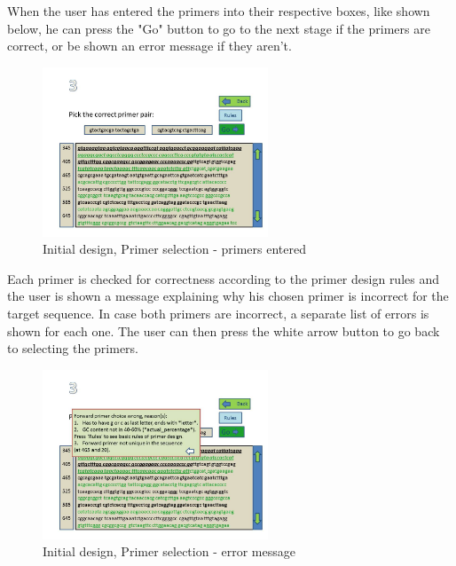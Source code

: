 When the user has entered the primers into their respective boxes, like shown below, he can press the "Go" button to go to the next stage if the primers are correct, or be shown an error message if they aren't.

\begin{figure}[h]
  \begin{center}
	\includegraphics[width=0.6\textwidth]{./images/UiDes/Slide4.jpg}
    \caption{
      \label{fig:UiDes:slide4}
      Initial design, Primer selection - primers entered
    }
  \end{center}
\end{figure}

Each primer is checked for correctness according to the primer design rules and the user is shown a message explaining why his chosen primer is incorrect for the target sequence. In case both primers are incorrect, a separate list of errors is shown for each one. The user can then press the white arrow button to go back to selecting the primers.

\begin{figure}[h]
  \begin{center}
	\includegraphics[width=0.6\textwidth]{./images/UiDes/Slide5.jpg}
    \caption{
      \label{fig:UiDes:slide5}
      Initial design, Primer selection - error message
    }
  \end{center}
\end{figure}


